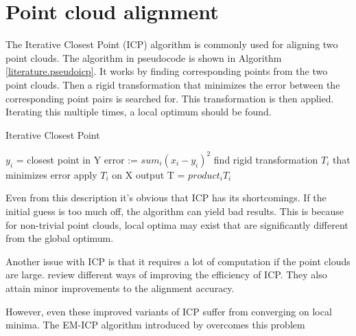 \section{Point cloud alignment} \label{literature.alignment}



The Iterative Closest Point (ICP) algorithm is commonly used for aligning two point clouds.  The algorithm in pseudocode is shown in Algorithm \ref{literature.pseudoicp}. It works by finding corresponding points from the two point clouds. Then a rigid transformation that minimizes the error between the corresponding point pairs is searched for. This transformation is then applied. Iterating this multiple times, a local optimum should be found.

\begin{algorithm}
\caption{Iterative Closest Point}
\label{literature.pseudoicp}
\begin{algorithmic}
            \State $y_i$ = closest point in Y
        \EndFor
        \State error := $sum_i (x_i-y_i)^2$
        \State find rigid transformation $T_i$ that minimizes error
        \State apply $T_i$ on X
    \EndFor
    \State \Return output T = $product_i T_i$
\end{algorithmic}
\end{algorithm}

Even from this description it's obvious that ICP has its shortcomings. If the initial guess is too much off, the algorithm can yield bad results. This is because for non-trivial point clouds, local optima may exist that are significantly different from the global optimum.

Another issue with ICP is that it requires a lot of computation if the point clouds are large. \citet{rusinkiewicz2001efficient} review different ways of improving the efficiency of ICP. They also attain minor improvements to the alignment accuracy.

However, even these improved variants of ICP suffer from converging on local minima. The EM-ICP  algorithm introduced by \citet{granger2006multi} overcomes this problem 

